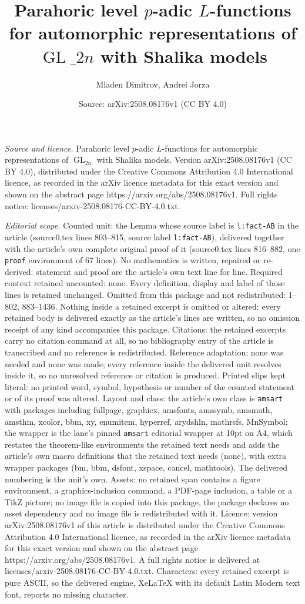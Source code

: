 \documentclass[10pt,a4paper]{amsart}
\title[Parahoric level $p$-adic $L$-functions for automorphic repre]{Parahoric level $p$-adic $L$-functions for automorphic representations of $\operatorname{GL}\_{2n}$ with Shalika models}
\author{Mladen Dimitrov, Andrei Jorza}
\date{Source: arXiv:2508.08176v1 (CC BY 4.0)}
\begin{document}
\maketitle

\noindent\emph{Source and licence.} Parahoric level $p$-adic $L$-functions for automorphic representations of $\operatorname{GL}_{2n}$ with Shalika models. Version arXiv:2508.08176v1 (CC BY 4.0), distributed under the Creative Commons Attribution 4.0 International licence, as recorded in the arXiv licence metadata for this exact version and shown on the abstract page https://arxiv.org/abs/2508.08176v1. Full rights notice: licenses/arxiv-2508.08176-CC-BY-4.0.txt.\par\smallskip

\noindent\textit{Editorial scope.} Counted unit: the Lemma whose source label is \texttt{l:fact-AB} in the article (source0.tex lines 803--815, source label \texttt{l:fact-AB}), delivered together with the article's own complete original proof of it (source0.tex lines 816--882, one \texttt{proof} environment of 67 lines). No mathematics is written, repaired or re-derived: statement and proof are the article's own text line for line. Required context retained uncounted: none. Every definition, display and label of those lines is retained unchanged. Omitted from this package and not redistributed: 1--802, 883--1436. Nothing inside a retained excerpt is omitted or altered: every retained body is delivered exactly as the article's lines are written, so no omission receipt of any kind accompanies this package. Citations: the retained excerpts carry no citation command at all, so no bibliography entry of the article is transcribed and no reference is redistributed. Reference adaptation: none was needed and none was made; every reference inside the delivered unit resolves inside it, so no unresolved reference or citation is produced. Printed slips kept literal: no printed word, symbol, hypothesis or number of the counted statement or of its proof was altered. Layout and class: the article's own class is \texttt{amsart} with packages including fullpage, graphicx, amsfonts, amssymb, amsmath, amsthm, xcolor, bbm, xy, enumitem, hyperref, arydshln, mathrsfs, MnSymbol; the wrapper is the lane's pinned \texttt{amsart} editorial wrapper at 10pt on A4, which restates the theorem-like environments the retained text needs and adds the article's own macro definitions that the retained text needs (none), with extra wrapper packages (bm, bbm, dsfont, xspace, cancel, mathtools). The delivered numbering is the unit's own. Assets: no retained span contains a figure environment, a graphics-inclusion command, a PDF-page inclusion, a table or a TikZ picture; no image file is copied into this package, the package declares no asset dependency and no image file is redistributed with it. Licence: version arXiv:2508.08176v1 of this article is distributed under the Creative Commons Attribution 4.0 International licence, as recorded in the arXiv licence metadata for this exact version and shown on the abstract page https://arxiv.org/abs/2508.08176v1. A full rights notice is delivered at licenses/arxiv-2508.08176-CC-BY-4.0.txt. Characters: every retained excerpt is pure ASCII, so the delivered engine, XeLaTeX with its default Latin Modern text font, reports no missing character.
\end{document}
